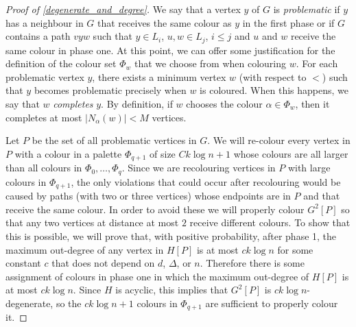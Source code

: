 \documentclass{patmorin}
\newcommand{\defin}[1]{\emph{\color{brightmaroon}#1}}
\begin{document}
\begin{proof}[Proof of \cref{degenerate_and_degree}]

  We say that a vertex $y$ of $G$ is \defin{problematic} if $y$ has a neighbour in $G$ that receives the same colour as $y$ in the first phase or if $G$ contains a path $vyw$ such that $y\in L_i$, $u,w\in L_j$, $i \le j$ and $u$ and $w$ receive the same colour in phase one.  At this point, we can offer some justification for the definition of the colour set $\Phi_w$ that we choose from when colouring $w$. For each problematic vertex $y$, there exists a minimum vertex $w$ (with respect to $<$) such that $y$ becomes problematic precisely when $w$ is coloured.  When this happens, we say that $w$ \defin{completes} $y$. By definition, if $w$ chooses the colour $\alpha\in\Phi_w$, then it completes at most $|N_{\alpha}(w)|<M$ vertices.

  Let $P$ be the set of all problematic vertices in $G$.  We will re-colour every vertex in $P$ with a colour in a palette $\Phi_{q+1}$ of size $Ck\log n + 1$ whose colours are all larger than all colours in $\Phi_0,\ldots,\Phi_q$.  Since we are recolouring vertices in $P$ with large colours in $\Phi_{q+1}$, the only violations that could occur after recolouring would be caused by paths (with two or three vertices) whose endpoints are in $P$ and that receive the same colour.  In order to avoid these we will properly colour $G^2[P]$ so that any two vertices at distance at most $2$ receive different colours.  To show that this is possible, we will prove that, with positive probability, after phase 1, the maximum out-degree of any vertex in $H[P]$ is at most $ck\log n$ for some constant $c$ that does not depend on $d$, $\Delta$, or $n$.  Therefore there is some assignment of colours in phase one in which the maximum out-degree of $H[P]$ is at most $ck\log n$.  Since $H$ is acyclic, this implies that $G^2[P]$ is $ck\log n$-degenerate, so the $ck\log n + 1$ colours in $\Phi_{q+1}$ are sufficient to properly colour it.


\end{proof}
\end{document}
